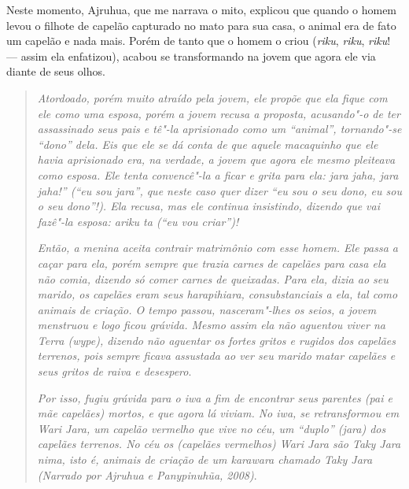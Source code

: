 Neste momento, Ajruhua, que me narrava o mito, explicou que quando o
homem levou o filhote de capelão capturado no mato para sua casa, o
animal era de fato um capelão e nada mais. Porém de tanto que o homem o
criou (\emph{riku}, \emph{riku}, \emph{riku}! --- assim ela enfatizou),
acabou se transformando na jovem que agora ele via diante de seus olhos.

\begin{quote}
\forceindent
\emph{Atordoado, porém muito atraído pela jovem, ele propõe que ela fique com
ele como uma esposa, porém a jovem recusa a proposta, acusando"-o de ter
assassinado seus pais e tê"-la aprisionado como um ``animal'',
tornando"-se ``dono'' dela. Eis que ele se dá conta de que aquele
macaquinho que ele havia aprisionado era, na verdade, a jovem que agora
ele mesmo pleiteava como esposa. Ele tenta convencê"-la a ficar e grita
para ela: \emph{jara jaha}, \emph{jara jaha}!'' (``eu sou \emph{jara''},
que neste caso quer dizer ``eu sou o seu dono, eu sou o seu dono''!). Ela
recusa, mas ele continua insistindo, dizendo que vai fazê"-la esposa:
\emph{ariku} \emph{ta} (``eu vou criar'')!}

\emph{Então, a menina aceita contrair matrimônio com esse homem. Ele passa a
caçar para ela, porém sempre que trazia carnes de capelães para casa ela
não comia, dizendo só comer carnes de queixadas. Para ela, dizia ao seu
marido, os capelães eram seus \emph{harapihiara}, consubstanciais a ela,
tal como animais de criação. O tempo passou, nasceram"-lhes os seios, a
jovem menstruou e logo ficou grávida. Mesmo assim ela não aguentou viver
na Terra (\emph{wype}), dizendo não aguentar os fortes gritos e rugidos
dos capelães terrenos, pois sempre ficava assustada ao ver seu marido
matar capelães e seus gritos de raiva e desespero}.

\emph{Por isso, fugiu grávida para o \emph{iwa} a fim de encontrar seus
parentes (pai e mãe capelães) mortos, e que agora lá viviam. No
\emph{iwa}, se retransformou em \emph{Wari} \emph{Jara}, um capelão
vermelho que vive no céu, um ``duplo'' (\emph{jara}) dos capelães
terrenos. No céu os (capelães vermelhos) \emph{Wari} \emph{Jara} são
\emph{Taky} \emph{Jara} \emph{nima}, isto é, animais de criação de um
\emph{karawara} chamado \emph{Taky} \emph{Jara} (Narrado por Ajruhua e Panypinuhũa,  2008)}.
\end{quote}


